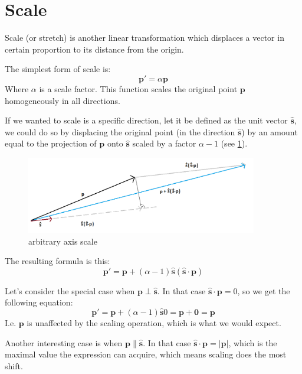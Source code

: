 \documentclass[]{report}   %
\begin{document}
\section{Scale}
Scale (or stretch) is another linear transformation which displaces a vector in certain proportion to its distance from the origin.

The simplest form of scale is:
\[ \mathbf{p\prime} = \alpha\mathbf{p} \]
Where \(\alpha\) is a scale factor. This function scales the original point \(\mathbf{p}\) homogeneously in all directions.



If we wanted to scale is a specific direction, let it be defined as the unit vector \(\mathbf{\hat{s}}\), we could do so by displacing the original point (in the direction \(\mathbf{\hat{s}}\)) by an amount equal to the projection of \(\mathbf{p}\) onto \(\mathbf{\hat{s}}\) scaled by a factor \(\alpha-1\) (see
\ref{fig:arb_axis_scale}).

\begin{figure}[htb]
\centering
\includegraphics[width=0.9\textwidth]{arbitrary-axis-scale-diagram}
\caption{arbitrary axis scale}
\label{fig:arb_axis_scale}
\end{figure}

The resulting formula is this:
\[
	\mathbf{p\prime} = 
	\mathbf{p} + (\alpha - 1) \mathbf{\hat{s}}(\mathbf{\hat{s}}\cdot \mathbf{p})
\]

Let's consider the special case when \(\mathbf{p}\perp\mathbf{\hat{s}}\). In that case \(\mathbf{\hat{s}}\cdot \mathbf{p} = 0\), so we get the following equation:
\[
	\mathbf{p\prime} = 
	\mathbf{p} + (\alpha - 1) \mathbf{\hat{s}}0 = \mathbf{p} + \mathbf{0} = \mathbf{p}
\]
I.e. \(\mathbf{p}\) is unaffected by the scaling operation, which is what we would expect.

Another interesting case is when \(\mathbf{p}\parallel\mathbf{\hat{s}}\). In that case \(\mathbf{\hat{s}}\cdot \mathbf{p} = |\mathbf{p}|\), which is the maximal value the expression can acquire, which means scaling does the most shift.
\end{document}
